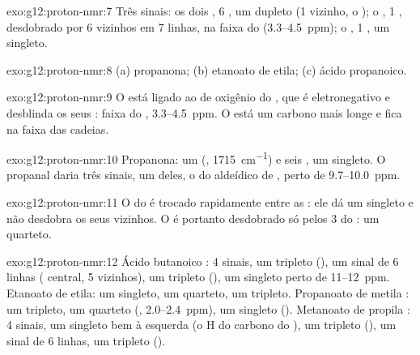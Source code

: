 \begin{solution}{exo:g12:proton-nmr:7}
Três sinais: os dois , 6 , um dupleto (1
vizinho, o ); o , 1 , desdobrado por 6 vizinhos em
7 linhas, na faixa do  (3.3--\qty{4.5}{ppm}); o , 1
, um singleto.
\end{solution}

\begin{solution}{exo:g12:proton-nmr:8}
(a) propanona; (b) etanoato de etila; (c) ácido propanoico.
\end{solution}

\begin{solution}{exo:g12:proton-nmr:9}
O  está ligado ao  de oxigênio do , que é
eletronegativo e desblinda os seus : faixa do ,
3.3--\qty{4.5}{ppm}. O  está um carbono mais longe e fica na
faixa das cadeias.
\end{solution}

\begin{solution}{exo:g12:proton-nmr:10}
Propanona: um  (, \qty{1715}{cm^{-1}}) e seis , um singleto. O propanal daria três sinais, um deles, o do
 aldeídico de , perto de 9.7--\qty{10.0}{ppm}.
\end{solution}

\begin{solution}{exo:g12:proton-nmr:11}
O  do  é trocado rapidamente entre as : ele dá um
singleto e não desdobra os seus vizinhos. O  é portanto
desdobrado só pelos 3  do : um quarteto.
\end{solution}

\begin{solution}{exo:g12:proton-nmr:12}
Ácido butanoico : 4 sinais, um tripleto (),
um sinal de 6 linhas ( central, 5 vizinhos), um tripleto
(), um singleto perto de 11--\qty{12}{ppm}. Etanoato de
etila: um singleto, um quarteto, um tripleto. Propanoato de metila :
um tripleto, um quarteto (, 2.0--\qty{2.4}{ppm}), um
singleto (). Metanoato de propila : 4
sinais, um singleto bem à esquerda (o H do carbono do ), um
tripleto (), um sinal de 6 linhas, um tripleto ().
\end{solution}

